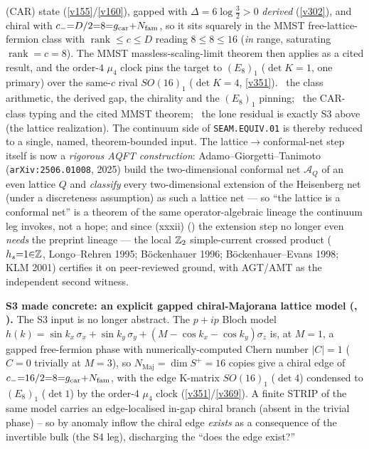 (CAR) state (\vref{v155}/\vref{v160}), gapped with $\Delta{=}6\log\tfrac32{>}0$ \emph{derived} (\vref{v302}), and
chiral with $c_-{=}D/2{=}8{=}g_{\mathrm{car}}{+}N_{\mathrm{fam}}$, so it sits squarely in the MMST free-lattice-fermion class with
$\operatorname{rank}\le c\le D$ reading $8\le8\le16$ (\emph{in} range, saturating $\operatorname{rank}{=}c{=}8$).
The MMST massless-scaling-limit theorem then applies as a cited result, and the order-$4$ $\mu_4$ clock pins the
target to $(E_8)_1$ ($\det K{=}1$, one primary) over the same-$c$ rival $SO(16)_1$ ($\det K{=}4$, \vref{v351}).
\mE\ the class arithmetic, the derived gap, the chirality and the $(E_8)_1$ pinning; \mC\ the CAR-class typing and
the cited MMST theorem; \mO\ the lone residual is exactly S3 above (the lattice realization). The continuum side
of \texttt{SEAM.EQUIV.01} is thereby reduced to a single, named, theorem-bounded input. The lattice$\to$conformal-net
step itself is now a \emph{rigorous AQFT construction}: Adamo--Giorgetti--Tanimoto (\texttt{arXiv:2506.01008}, 2025)
build the two-dimensional conformal net $\mathcal A_Q$ of an even lattice $Q$ and \emph{classify} every
two-dimensional extension of the Heisenberg net (under a discreteness assumption) as such a lattice net --- so
``the lattice is a conformal net'' is a theorem of the same operator-algebraic lineage the continuum leg invokes,
not a hope; and since (xxxii) () the extension step no longer even
\emph{needs} the preprint lineage --- the local $\mathbb Z_2$ simple-current crossed product ($h_s{=}1{\in}\mathbb Z$,
Longo--Rehren 1995; B\"ockenhauer 1996; B\"ockenhauer--Evans 1998; KLM 2001) certifies it on peer-reviewed
ground, with AGT/AMT as the independent second witness.
\par\smallskip\noindent\textbf{S3 made concrete: an explicit gapped chiral-Majorana lattice model
(, ).} The S3 input is no longer
abstract. The $p{+}ip$ Bloch model $h(k){=}\sin k_x\,\sigma_x{+}\sin k_y\,\sigma_y{+}(M{-}\cos k_x{-}\cos
k_y)\sigma_z$ is, at $M{=}1$, a gapped free-fermion phase with numerically-computed Chern number $|C|{=}1$
($C{=}0$ trivially at $M{=}3$), so $N_{\mathrm{Maj}}{=}\dim S^+{=}16$ copies give a chiral edge of
$c_-{=}16/2{=}8{=}g_{\mathrm{car}}{+}N_{\mathrm{fam}}$, with the edge K-matrix $SO(16)_1$ ($\det 4$) condensed to $(E_8)_1$
($\det 1$) by the order-4 $\mu_4$ clock (\vref{v351}/\vref{v369}). A finite STRIP of the same model carries
an edge-localised in-gap chiral branch (absent in the trivial phase) -- so by anomaly inflow the chiral edge
\emph{exists} as a consequence of the invertible bulk (the S4 leg), discharging the ``does the edge exist?''
